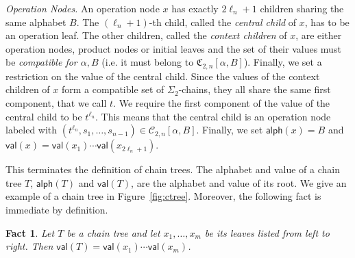 \documentclass[envcountsame]{llncs}
\newcommand\Cs{\ensuremath{\mathcal{C}}\xspace}
\newcommand\Cstwolen[1]{\ensuremath{\Cs_{2,#1}}\xspace}
\newcommand\Cstwon{\ensuremath{\Cstwolen{n}}\xspace}
\newcommand\fCtwon{\ensuremath{\fC_{2,n}}\xspace}
\newcommand{\sic}[1]{\ensuremath{\Sigma_{#1}}\xspace}
\newcommand\content[1]{\ensuremath{\contentmorphism(#1)}}
\newcommand\contentmorphism{\ensuremath{\textsf{alph}}}
\newcommand\val[1]{\ensuremath{\textsf{val}(#1)\xspace}}
\newcommand\chain{chain\xspace}
\newcommand\qchains[1]{\ensuremath{\sic{#1}}-chains\xspace}
\newcommand\dchains{\qchains{2}}
\newcommand\fC{\ensuremath{\mathfrak C}\xspace}
\newtheorem{fact}[theorem]{Fact}
\begin{document}
\medskip
\noindent
{\it Operation Nodes.} An operation node $x$ has exactly $2 \ell_n + 
1$ children sharing the same alphabet $B$. The $(\ell_n + 1)$-th
child, called the \emph{central child} of $x$, has to be an operation 
leaf. The other children, called the \emph{context children} of $x$,
are either operation nodes, product nodes or initial leaves and the
set of their values must be \emph{compatible for $\alpha,B$} (i.e. it
must belong to $\fCtwon[\alpha,B]$). Finally, we set a restriction on
the value of the central child. Since the values of the context
children of $x$ form a compatible set of \dchains, they all share the
same first component, that we call $t$. We require the first component
of the value of the central child to be $t^{\ell_n}$. This means that
the central child is an operation node labeled with
$(t^{\ell_n},s_1,\dots,s_{n-1}) \in \Cstwon[\alpha,B]$. Finally, we
set $\content{x} = B$ and $\val{x} = \val{x_1} \cdots
\val{x_{2\ell_n+1}}$.







\medskip
This terminates the definition of \chain trees. The alphabet and value
of a \chain tree $T$, \content{T} and \val{T}, are the alphabet and
value of its root. We give an example of a \chain tree in
Figure~\ref{fig:ctree}. Moreover, the following fact is immediate by
definition.





\begin{fact} \label{fct:value}
  Let $T$ be a \chain tree and let $x_1,\dots,x_m$ be its leaves listed
  from left to right. Then $\val{T} = \val{x_1} \cdots \val{x_m}$.
\end{fact}
\end{document}
